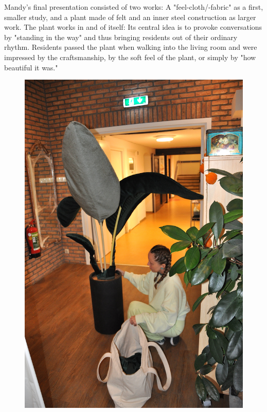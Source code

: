 \documentclass[authordate, empirical]{jote-new-article}
\begin{document}
{	Mandy's final presentation consisted of two works: A "feel-cloth/-fabric" as a first, smaller study, and a plant made of felt and an inner steel construction as larger work. The plant works in and of itself: Its central idea is to provoke conversations by "standing in the way" and thus bringing residents out of their ordinary rhythm. Residents passed the plant when walking into the living room and were impressed by the craftsmanship, by the soft feel of the plant, or simply by "how beautiful it was."







	\begin{figure}
		\includegraphics[width=\linewidth]{media/fig2.jpeg}


\end{figure}}
\end{document}
